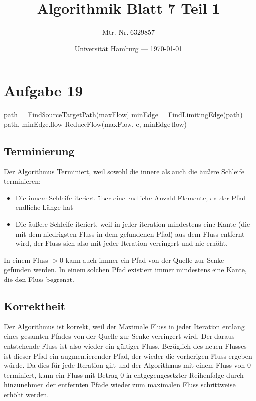 \documentclass[parskip=half,a4paper]{scrartcl}
\title{Algorithmik Blatt 7 Teil 1}
\author{Mtr.-Nr. 6329857}
\date{Universität Hamburg --- \today}
\begin{document}
\maketitle %

\linenumbers

\section*{Aufgabe 19}

\nolinenumbers
\begin{algorithmic}[1]
\State path = FindSourceTargetPath(maxFlow)
\State minEdge = FindLimitingEdge(path)
\Output path, minEdge.flow
\State ReduceFlow(maxFlow, e, minEdge.flow)
\EndForeach
\EndWhile
\EndProcedure
\end{algorithmic}
\linenumbers

\subsection*{Terminierung}


Der Algorithmus Terminiert, weil sowohl die innere als auch die äußere Schleife terminieren:

\begin{itemize}
    \item Die innere Schleife iteriert über eine endliche Anzahl Elemente, da der Pfad endliche Länge hat
    \item Die äußere Schleife iteriert, weil in jeder iteration mindestens eine Kante (die mit dem niedrigsten Fluss in dem gefundenen Pfad) aus dem Fluss entfernt wird, der Fluss sich also mit jeder Iteration verringert und nie erhöht.
\end{itemize}

In einem Fluss $>0$ kann auch immer ein Pfad von der Quelle zur Senke gefunden werden. In einem solchen Pfad existiert immer mindestens eine Kante, die den Fluss begrenzt.

\subsection*{Korrektheit}

Der Algorithmus ist korrekt, weil der Maximale Fluss in jeder Iteration entlang eines gesamten Pfades von der Quelle zur Senke verringert wird. Der daraus entstehende Fluss ist also wieder ein gültiger Fluss. Bezüglich des neuen Flusses ist dieser Pfad ein augmentierender Pfad, der wieder die vorherigen Fluss ergeben würde. Da dies für jede Iteration gilt und der Algorithmus mit einem Fluss von $0$ terminiert, kann ein Fluss mit Betrag $0$ in entgegengesetzter Reihenfolge durch hinzunehmen der entfernten Pfade wieder zum maximalen Fluss schrittweise erhöht werden.
\end{document}
